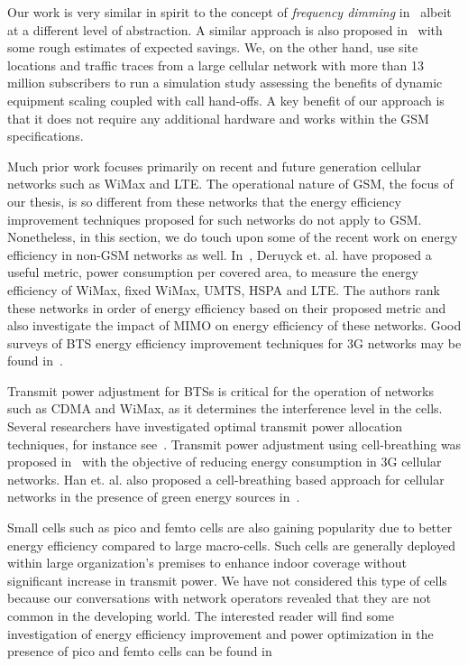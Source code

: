 Our work is very similar in spirit to the concept of
\textit{frequency dimming}
in~\cite{Tipper:Dimming:Globecom:2010} albeit at a different
level of abstraction. A similar approach is also proposed
in~\cite{Blume:2010:BLTJ:CellularPower} with some rough
estimates of expected savings. We, on the other hand, use site
locations and traffic traces from a large cellular network with
more than 13 million subscribers to run a simulation study
assessing the benefits of dynamic equipment scaling coupled
with call hand-offs.
A key benefit of our approach is that it 
does not require any additional hardware
and works within the GSM specifications.

Much prior work focuses primarily on recent and future generation cellular networks such as WiMax and LTE. The operational nature of GSM, the focus of our thesis, is so different from these networks that the energy efficiency improvement techniques proposed for such networks do not apply to GSM. Nonetheless, in this section, we do touch upon some of the recent work on energy efficiency in non-GSM networks as well. In~\cite{Deruyck20112036}, Deruyck et. al. have proposed a useful metric, power consumption per covered area, to measure the energy efficiency of WiMax, fixed WiMax, UMTS, HSPA and LTE. The authors rank these networks in order of energy efficiency based on their proposed metric and also investigate the impact of MIMO on energy efficiency of these networks. Good surveys of BTS energy efficiency improvement techniques for 3G networks may be found in~\cite{6056687,5783984}.

Transmit power adjustment for BTSs is critical for the operation of networks such as CDMA and WiMax, as it determines the interference level in the cells. Several researchers have investigated optimal transmit power allocation techniques, for instance see~\cite{Kavitha20131373,Xu:powercontrol:2013}. Transmit power adjustment using cell-breathing was proposed in~\cite{Bhaumik:2010:BSC:1851290.1851300} with the objective of reducing energy consumption in 3G cellular networks. Han et. al. also proposed a cell-breathing based approach for cellular networks in the presence of green energy sources in~\cite{6189819}.

Small cells such as pico and femto cells are also gaining popularity due to better energy efficiency compared to large macro-cells. Such cells are generally deployed within large organization's premises to enhance indoor coverage without significant increase in transmit power. We have not considered this type of cells because our conversations with network operators revealed that they are not common in the developing world. The interested reader will find some investigation of energy efficiency improvement and power optimization in the presence of pico and femto cells can be found in~\cite{6576465,6491498} 

